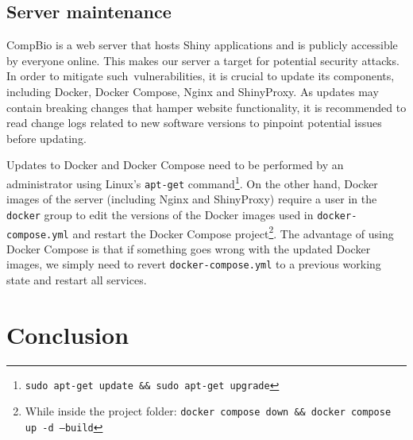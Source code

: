 \subsection{Server maintenance}


CompBio is a web server that hosts Shiny applications and is publicly accessible by everyone online. This makes our server a target for potential security attacks. In order to mitigate such vulnerabilities, it is crucial to update its components, including Docker, Docker Compose, Nginx and ShinyProxy. As updates may contain breaking changes that hamper website functionality, it is recommended to read change logs related to new software versions to pinpoint potential issues before updating.


Updates to Docker and Docker Compose need to be performed by an administrator using Linux's \texttt{apt-get} command\footnote{\texttt{sudo apt-get update \&\& sudo apt-get upgrade}}. On the other hand, Docker images of the server (including Nginx and ShinyProxy) require a user in the \texttt{docker} group to edit the versions of the Docker images used in \texttt{docker-compose.yml} and restart the Docker Compose project\footnote{While inside the project folder: \texttt{docker compose down \&\& docker compose up -d --build}}. The advantage of using Docker Compose is that if something goes wrong with the updated Docker images, we simply need to revert \texttt{docker-compose.yml} to a previous working state and restart all services.

\section{Conclusion}


